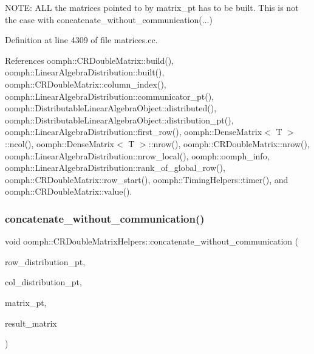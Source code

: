 N\+O\+TE\+: A\+LL the matrices pointed to by matrix\+\_\+pt has to be built. This is not the case with concatenate\+\_\+without\+\_\+communication(...) 

Definition at line 4309 of file matrices.\+cc.



References oomph\+::\+C\+R\+Double\+Matrix\+::build(), oomph\+::\+Linear\+Algebra\+Distribution\+::built(), oomph\+::\+C\+R\+Double\+Matrix\+::column\+\_\+index(), oomph\+::\+Linear\+Algebra\+Distribution\+::communicator\+\_\+pt(), oomph\+::\+Distributable\+Linear\+Algebra\+Object\+::distributed(), oomph\+::\+Distributable\+Linear\+Algebra\+Object\+::distribution\+\_\+pt(), oomph\+::\+Linear\+Algebra\+Distribution\+::first\+\_\+row(), oomph\+::\+Dense\+Matrix$<$ T $>$\+::ncol(), oomph\+::\+Dense\+Matrix$<$ T $>$\+::nrow(), oomph\+::\+C\+R\+Double\+Matrix\+::nrow(), oomph\+::\+Linear\+Algebra\+Distribution\+::nrow\+\_\+local(), oomph\+::oomph\+\_\+info, oomph\+::\+Linear\+Algebra\+Distribution\+::rank\+\_\+of\+\_\+global\+\_\+row(), oomph\+::\+C\+R\+Double\+Matrix\+::row\+\_\+start(), oomph\+::\+Timing\+Helpers\+::timer(), and oomph\+::\+C\+R\+Double\+Matrix\+::value().

\mbox{\label{namespaceoomph_1_1CRDoubleMatrixHelpers_ab335593fd53dbb5162fd63f14db95377}} 
\subsubsection{\texorpdfstring{concatenate\+\_\+without\+\_\+communication()}{concatenate\_without\_communication()}\hspace{0.1cm}{\footnotesize\ttfamily [1/2]}}
{\footnotesize\ttfamily void oomph\+::\+C\+R\+Double\+Matrix\+Helpers\+::concatenate\+\_\+without\+\_\+communication (\begin{DoxyParamCaption}\item[{const \hyperlink{classoomph_1_1Vector}{Vector}$<$ \hyperlink{classoomph_1_1LinearAlgebraDistribution}{Linear\+Algebra\+Distribution} $\ast$$>$ \&}]{row\+\_\+distribution\+\_\+pt,  }\item[{const \hyperlink{classoomph_1_1Vector}{Vector}$<$ \hyperlink{classoomph_1_1LinearAlgebraDistribution}{Linear\+Algebra\+Distribution} $\ast$$>$ \&}]{col\+\_\+distribution\+\_\+pt,  }\item[{const \hyperlink{classoomph_1_1DenseMatrix}{Dense\+Matrix}$<$ \hyperlink{classoomph_1_1CRDoubleMatrix}{C\+R\+Double\+Matrix} $\ast$$>$ \&}]{matrix\+\_\+pt,  }\item[{\hyperlink{classoomph_1_1CRDoubleMatrix}{C\+R\+Double\+Matrix} \&}]{result\+\_\+matrix }\end{DoxyParamCaption})}



